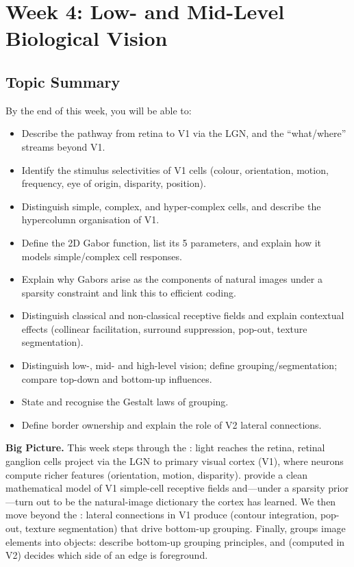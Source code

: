 \section{Week 4: Low- and Mid-Level Biological Vision}

\subsection{Topic Summary}

\begin{keybox}
By the end of this week, you will be able to:
\begin{itemize}
  \item Describe the pathway from retina to V1 via the LGN, and the ``what/where'' streams beyond V1.
  \item Identify the stimulus selectivities of V1 cells (colour, orientation, motion, frequency, eye of origin, disparity, position).
  \item Distinguish simple, complex, and hyper-complex cells, and describe the hypercolumn organisation of V1.
  \item Define the 2D Gabor function, list its 5 parameters, and explain how it models simple/complex cell responses.
  \item Explain why Gabors arise as the components of natural images under a sparsity constraint and link this to efficient coding.
  \item Distinguish classical and non-classical receptive fields and explain contextual effects (collinear facilitation, surround suppression, pop-out, texture segmentation).
  \item Distinguish low-, mid- and high-level vision; define grouping/segmentation; compare top-down and bottom-up influences.
  \item State and recognise the Gestalt laws of grouping.
  \item Define border ownership and explain the role of V2 lateral connections.
\end{itemize}
\end{keybox}

\textbf{Big Picture.}
This week steps through the : light reaches the retina, retinal ganglion cells project via the LGN to primary visual cortex (V1), where neurons compute richer features (orientation, motion, disparity).  provide a clean mathematical model of V1 simple-cell receptive fields and---under a sparsity prior---turn out to be the natural-image dictionary the cortex has learned. We then move beyond the : lateral connections in V1 produce  (contour integration, pop-out, texture segmentation) that drive bottom-up grouping. Finally,  groups image elements into objects:  describe bottom-up grouping principles, and  (computed in V2) decides which side of an edge is foreground.

